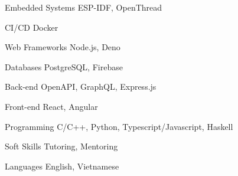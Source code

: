 

\begin{cvskills}

  \cvskill
    {Embedded Systems} %
    {ESP-IDF, OpenThread} %

  \cvskill
    {CI/CD}
    {Docker}

  \cvskill
    {Web Frameworks}
    {Node.js, Deno}

  \cvskill
    {Databases}
    {PostgreSQL, Firebase}

  \cvskill
    {Back-end} %
    {OpenAPI, GraphQL, Express.js} %

  \cvskill
    {Front-end} %
    {React, Angular} %

  \cvskill
    {Programming} %
    {C/C++, Python, Typescript/Javascript, Haskell} %

  \cvskill
    {Soft Skills} %
    {Tutoring, Mentoring} %

  \cvskill
    {Languages}
    {English, Vietnamese}

\end{cvskills}
